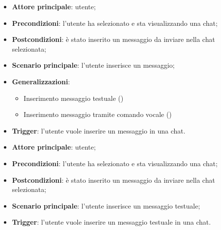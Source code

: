 \documentclass[10pt, a4paper]{article}
\begin{document}

    \begin{itemize}
        \item \textbf{Attore principale}: utente;
        \item \textbf{Precondizioni}: l’utente ha selezionato e sta visualizzando una chat;
        \item \textbf{Postcondizioni}: è stato inserito un messaggio da inviare nella chat selezionata;
        \item \textbf{Scenario principale}: l’utente inserisce un messaggio;
        \item \textbf{Generalizzazioni}:
            \begin{itemize}
                \item Inserimento messaggio testuale ()
                \item Inserimento messaggio tramite comando vocale ()
            \end{itemize}
        \item \textbf{Trigger}: l’utente vuole inserire un messaggio in una chat.
    \end{itemize}
    
    \begin{itemize}
        \item \textbf{Attore principale}: utente;
        \item \textbf{Precondizioni}: l’utente ha selezionato e sta visualizzando una chat;
        \item \textbf{Postcondizioni}: è stato inserito un messaggio da inviare nella chat selezionata;
        \item \textbf{Scenario principale}: l’utente inserisce un messaggio testuale;
        \item \textbf{Trigger}: l’utente vuole inserire un messaggio testuale in una chat.
    \end{itemize}
    
\end{document}
